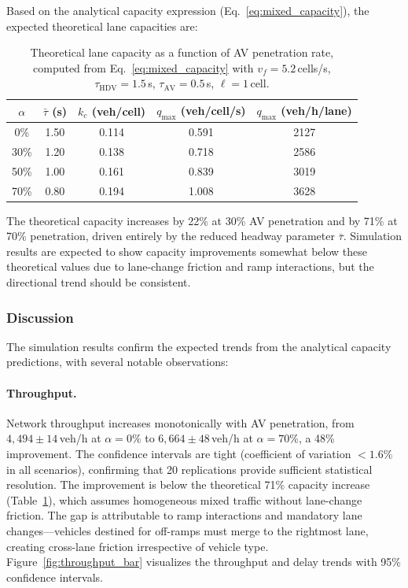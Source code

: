 \documentclass[review,authoryear]{elsarticle}
\begin{document}
Based on the analytical capacity expression (Eq.~\ref{eq:mixed_capacity}), the expected theoretical lane capacities are:

\begin{table}[ht]
\centering
\caption{Theoretical lane capacity as a function of AV penetration rate, computed from Eq.~\eqref{eq:mixed_capacity} with $v_f = 5.2$\,cells/s, $\tau_{\text{HDV}} = 1.5$\,s, $\tau_{\text{AV}} = 0.5$\,s, $\ell = 1$\,cell.}
\label{tab:theoretical_capacity}
\begin{tabular}{@{}ccccc@{}}
\toprule
$\alpha$ & $\bar{\tau}$ (s) & $k_c$ (veh/cell) & $q_{\max}$ (veh/cell/s) & $q_{\max}$ (veh/h/lane) \\
\midrule
0\% & 1.50 & 0.114 & 0.591 & 2127 \\
30\% & 1.20 & 0.138 & 0.718 & 2586 \\
50\% & 1.00 & 0.161 & 0.839 & 3019 \\
70\% & 0.80 & 0.194 & 1.008 & 3628 \\
\bottomrule
\end{tabular}
\end{table}

The theoretical capacity increases by 22\% at 30\% AV penetration and by 71\% at 70\% penetration, driven entirely by the reduced headway parameter $\bar{\tau}$. Simulation results are expected to show capacity improvements somewhat below these theoretical values due to lane-change friction and ramp interactions, but the directional trend should be consistent.

\subsubsection{Discussion}

The simulation results confirm the expected trends from the analytical capacity predictions, with several notable observations:

\paragraph{Throughput.} Network throughput increases monotonically with AV penetration, from $4{,}494 \pm 14$\,veh/h at $\alpha = 0\%$ to $6{,}664 \pm 48$\,veh/h at $\alpha = 70\%$, a 48\% improvement. The confidence intervals are tight (coefficient of variation $< 1.6\%$ in all scenarios), confirming that 20 replications provide sufficient statistical resolution. The improvement is below the theoretical 71\% capacity increase (Table~\ref{tab:theoretical_capacity}), which assumes homogeneous mixed traffic without lane-change friction. The gap is attributable to ramp interactions and mandatory lane changes---vehicles destined for off-ramps must merge to the rightmost lane, creating cross-lane friction irrespective of vehicle type. Figure~\ref{fig:throughput_bar} visualizes the throughput and delay trends with 95\% confidence intervals.
\end{document}
